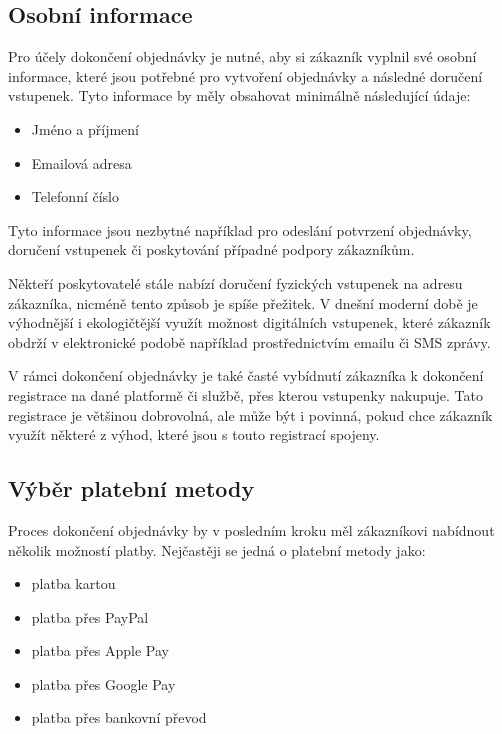 \subsection{Osobní informace}
\label{subsec:specifikace-dokonceni-objednavky-osobni-informace}
Pro účely dokončení objednávky je nutné, aby si zákazník vyplnil své osobní informace, které jsou potřebné pro vytvoření objednávky a následné doručení vstupenek.
Tyto informace by měly obsahovat minimálně následující údaje:

\begin{itemize}
    \item Jméno a příjmení
    \item Emailová adresa
    \item Telefonní číslo
\end{itemize}

Tyto informace jsou nezbytné například pro odeslání potvrzení objednávky, doručení vstupenek či poskytování případné podpory zákazníkům.

Někteří poskytovatelé stále nabízí doručení fyzických vstupenek na adresu zákazníka, nicméně tento způsob je spíše přežitek.
V dnešní moderní době je výhodnější i ekologičtější využít možnost digitálních vstupenek, které zákazník obdrží v elektronické podobě například prostřednictvím emailu či SMS zprávy.

V rámci dokončení objednávky je také časté vybídnutí zákazníka k dokončení registrace na dané platformě či službě, přes kterou vstupenky nakupuje.
Tato registrace je většinou dobrovolná, ale může být i povinná, pokud chce zákazník využít některé z výhod, které jsou s touto registrací spojeny.

\subsection{Výběr platební metody}
\label{subsec:specifikace-dokonceni-objednavky-vyber-platebni-metody}
Proces dokončení objednávky by v posledním kroku měl zákazníkovi nabídnout několik možností platby.
Nejčastěji se jedná o platební metody jako:

\begin{itemize}
    \item platba kartou
    \item platba přes PayPal
    \item platba přes Apple Pay
    \item platba přes Google Pay
    \item platba přes bankovní převod
\end{itemize}

